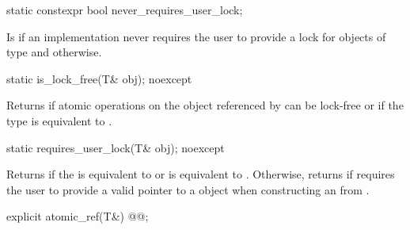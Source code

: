 \begin{addedblock}
\begin{itemdecl}
static constexpr bool never_requires_user_lock;
\end{itemdecl}

\begin{itemdescr}
\pnum
Is  if an implementation never requires the user to provide a 
lock for objects of type  and  otherwise.
\end{itemdescr}

\begin{itemdecl}
static is_lock_free(T& obj); noexcept
\end{itemdecl}

\begin{itemdescr}
\returns Returns  if atomic operations on the object referenced by
 can be lock-free or if the  type is equivalent to 
.
\end{itemdescr}

\begin{itemdecl}
static requires_user_lock(T& obj); noexcept
\end{itemdecl}

\begin{itemdescr}
\returns Returns  if the  is equivalent to 
or  is equivalent to .
Otherwise, returns  if  requires the user to
provide a valid pointer to a  object when constructing an 
 from . 
\end{itemdescr}
\end{addedblock}

\begin{itemdecl}
explicit atomic_ref(T&) @@;
\end{itemdecl}

